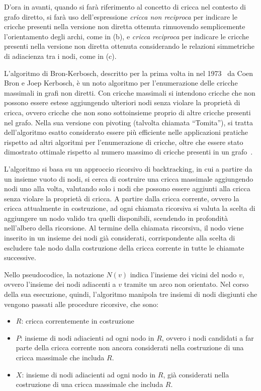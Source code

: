D'ora in avanti, quando si far\`a riferimento al concetto di cricca nel contesto di grafo diretto, si far\`a
uso dell'espressione \textit{cricca non reciproca} per indicare le cricche presenti nella versione non diretta
ottenuta rimuovendo semplicemente l'orientamento degli archi, come in (b), e \textit{cricca reciproca} per indicare
le cricche presenti nella versione non diretta ottenuta considerando le relazioni simmetriche di adiacienza tra i nodi,
come in (c).



L'algoritmo di Bron-Kerbosch, descritto per la prima volta in nel 1973~\cite{10.1145/362342.362367} da
Coen Bron e Joep Kerbosch, \`e un noto algoritmo per l'enumerazione delle cricche massimali in grafi non diretti.
Con cricche massimali si intendono cricche che non possono essere estese aggiungendo ulteriori nodi senza
violare la propriet\`a di cricca, ovvero cricche che non sono sottoinsieme proprio di altre cricche presenti nel grafo.
Nella sua versione con pivoting (talvolta chiamata ``Tomita''), si tratta dell'algoritmo esatto considerato essere
pi\`u efficiente nelle applicazioni pratiche rispetto ad altri algoritmi per l'enumerazione di cricche, oltre che
essere stato dimostrato ottimale rispetto al numero massimo di cricche presenti in un grafo~\cite{TOMITA200628}.
\newline

L'algoritmo si basa su un approccio ricorsivo di backtracking, in cui a partire da un insieme vuoto di nodi, si
cerca di costruire una cricca massimale aggiungendo nodi uno alla volta, valutando solo i nodi che
possono essere aggiunti alla cricca senza violare la propriet\`a di cricca.
A partire dalla cricca corrente, ovvero la cricca attualmente in costruzione, ad ogni chiamata ricorsiva si valuta
la scelta di aggiungere un nodo valido tra quelli disponibili, scendendo in profondit\`a nell'albero della ricorsione.
Al termine della chiamata riscorsiva, il nodo viene inserito in un insieme dei nodi
gi\`a considerati, corrispondente alla scelta di escludere tale nodo dalla costruzione della cricca corrente in tutte
le chiamate successive. \newline



Nello pseudocodice, la notazione $N(v)$ indica l'insieme dei vicini del nodo $v$, ovvero l'insieme dei nodi adiacenti
a $v$ tramite un arco non orientato.
Nel corso della sua esecuzione, quindi, l'algoritmo manipola tre insiemi di nodi disgiunti che vengono passati
alle procedure ricorsive, che sono:
\begin{itemize}
    \item $R$: cricca correntemente in costruzione
    \item $P$: insieme di nodi adiacienti ad ogni nodo in $R$, ovvero i nodi candidati a far parte della cricca corrente
    non ancora considerati nella costruzione di una cricca massimale che includa $R$.
    \item $X$: insieme di nodi adiacienti ad ogni nodo in $R$, gi\`a considerati nella costruzione di una cricca
    massimale che includa $R$.
\end{itemize}

